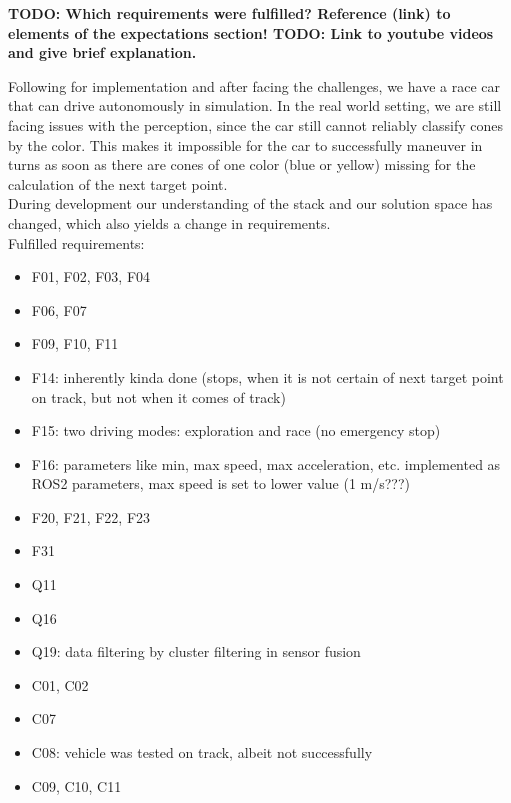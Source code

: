 \textbf{TODO: Which requirements were fulfilled? Reference (link) to elements of the expectations section! TODO: Link to youtube videos and give brief explanation.}

Following for implementation and after facing the challenges, we have a race car that can drive autonomously in simulation. In the real world setting, we are still facing issues with the perception, since the car still cannot reliably classify cones by the color. This makes it impossible for the car to successfully maneuver in turns as soon as there are cones of one color (blue or yellow) missing for the calculation of the next target point. \\
During development our understanding of the stack and our solution space has changed, which also yields a change in requirements. \\

Fulfilled requirements:
\begin{itemize}
	\item F01, F02, F03, F04
	\item F06, F07
	\item F09, F10, F11
	\item F14: inherently kinda done (stops, when it is not certain of next target point on track, but not when it comes of track)
	\item F15: two driving modes: exploration and race (no emergency stop)
	\item F16: parameters like min, max speed, max acceleration, etc. implemented as ROS2 parameters, max speed is set to lower value (1 m/s???)
	\item F20, F21, F22, F23
	\item F31
	\item Q11
	\item Q16
	\item Q19: data filtering by cluster filtering in sensor fusion
	\item C01, C02
	\item C07
	\item C08: vehicle was tested on track, albeit not successfully
	\item C09, C10, C11
\end{itemize}

